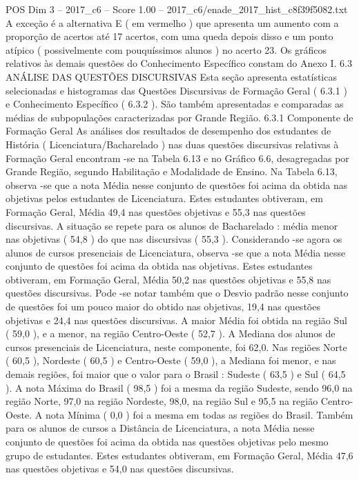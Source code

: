 \begin{textsample}{POS Dim 3 – 2017\_c6 – Score 1.00 – 2017\_c6/enade\_2017\_hist\_c8f39f5082.txt}
A exceção é a alternativa E ( em vermelho ) que apresenta um aumento com a proporção de acertos até 17 acertos, com uma queda depois disso e um ponto atípico ( possivelmente com pouquíssimos alunos ) no acerto 23.
Os gráficos relativos às demais questões do Conhecimento Específico constam do Anexo I. 6.3 ANÁLISE DAS QUESTÕES DISCURSIVAS Esta seção apresenta estatísticas selecionadas e histogramas das Questões Discursivas de Formação Geral ( 6.3.1 ) e Conhecimento Específico ( 6.3.2 ).
São também apresentadas e comparadas as médias de subpopulações caracterizadas por Grande Região. 6.3.1 Componente de Formação Geral As análises dos resultados de desempenho dos estudantes de História ( Licenciatura/Bacharelado ) nas duas questões discursivas relativas à Formação Geral encontram -se na Tabela 6.13 e no Gráfico 6.6, desagregadas por Grande Região, segundo Habilitação e Modalidade de Ensino.
Na Tabela 6.13, observa -se que a nota Média nesse conjunto de questões foi acima da obtida nas objetivas pelos estudantes de Licenciatura.
Estes estudantes obtiveram, em Formação Geral, Média 49,4 nas questões objetivas e 55,3 nas questões discursivas.
A situação se repete para os alunos de Bacharelado : média menor nas objetivas ( 54,8 ) do que nas discursivas ( 55,3 ).
Considerando -se agora os alunos de cursos presenciais de Licenciatura, observa -se que a nota Média nesse conjunto de questões foi acima da obtida nas objetivas.
Estes estudantes obtiveram, em Formação Geral, Média 50,2 nas questões objetivas e 55,8 nas questões discursivas.
Pode -se notar também que o Desvio padrão nesse conjunto de questões foi um pouco maior do obtido nas objetivas, 19,4 nas questões objetivas e 24,4 nas questões discursivas.
A maior Média foi obtida na região Sul ( 59,0 ), e a menor, na região Centro-Oeste ( 52,7 ).
A Mediana dos alunos de cursos presenciais de Licenciatura, neste componente, foi 62,0.
Nas regiões Norte ( 60,5 ), Nordeste ( 60,5 ) e Centro-Oeste ( 59,0 ), a Mediana foi menor, e nas demais regiões, foi maior que o valor para o Brasil : Sudeste ( 63,5 ) e Sul ( 64,5 ).
A nota Máxima do Brasil ( 98,5 ) foi a mesma da região Sudeste, sendo 96,0 na região Norte, 97,0 na região Nordeste, 98,0, na região Sul e 95,5 na região Centro-Oeste.
A nota Mínima ( 0,0 ) foi a mesma em todas as regiões do Brasil.
Também para os alunos de cursos a Distância de Licenciatura, a nota Média nesse conjunto de questões foi acima da obtida nas questões objetivas pelo mesmo grupo de estudantes.
Estes estudantes obtiveram, em Formação Geral, Média 47,6 nas questões objetivas e 54,0 nas questões discursivas.

\end{textsample}
